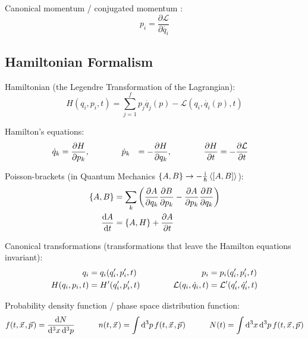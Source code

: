 		\noindent
		Canonical momentum / conjugated momentum :
		\begin{equation}
			p_i=\frac{\partial \mathcal{L}}{\partial\dot{q_i}}
		\end{equation}

	\subsection{Hamiltonian Formalism}
		\noindent
		Hamiltonian (\ie the Legendre Transformation of the Lagrangian):
		\begin{equation}
			H(q_i,p_i,t)=\sum_{j=1}^{f}p_j\dot{q_j}(p) - \mathcal{L}(q_i, \dot{q_i}(p),t)
		\end{equation}

		\noindent
		Hamilton's equations:
		\begin{equation}
			\begin{aligned}
				\dot{q}_k &= \pdv{H}{p_k}, &&\hspace{30pt}
				\dot{p}_k &= -\pdv{H}{q_k}, &&\hspace{30pt}
				\pdv{H}{t} &= -\pdv{\mathcal{L}}{t}
			\end{aligned}
		\end{equation}

		\noindent
		Poisson-brackets (in Quantum Mechanics $\qty{A,B} \to -\frac{\i}{\hbar}\Avg{\comm{A}{B}}$):
		\begin{equation}
			\begin{aligned}
				\qty{A,B} &= \sum_k \left(
				\pdv{A}{q_k}\pdv{B}{p_k} - \pdv{A}{p_k}\pdv{B}{q_k}
				\right) \\
				\dv{A}{t} &= \qty{A, H} + \pdv{A}{t}
			\end{aligned}
		\end{equation}

		\noindent
		Canonical transformations (transformations that leave the Hamilton equations invariant):
		\begin{equation}
			\begin{aligned}
				q_i &= q_i(q_i',p_i',t) &\hspace{30pt}
				p_i &= p_i(q_i',p_i',t) \\
				H(q_i,p_i,t) &= H'(q_i',p_i',t) &\hspace{30pt}
				\mathcal{L}(q_i,\dot{q}_i,t) &= \mathcal{L}'(q_i',\dot{q}_i',t) \\
			\end{aligned}
		\end{equation}

		\noindent
		Probability density function / phase space distribution function:
		\begin{equation}
			f(t,\vec{x},\vec{p}) = \frac{\dd N}{\dd[3]{x}\dd[3]{p}}
			\hsp
			n(t,\vec{x}) = \int \dd[3]{p} f(t,\vec{x},\vec{p})
			\hsp
			N(t) = \int \dd[3]{x}\dd[3]{p} f(t,\vec{x},\vec{p})
		\end{equation}
		
